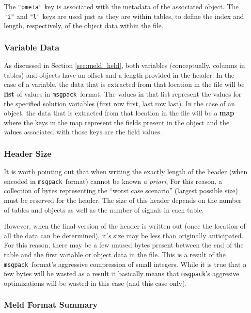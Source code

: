 \documentclass[11pt,a4paper,twocolumn]{article}
\newcommand{\msgpack}{\texttt{msgpack}}
\newcommand{\code}[1]{\texttt{#1}} %
\begin{document}
The \code{"ometa"} key is associated with the metadata of the
associated object.  The \code{"i"} and \code{"l"} keys are used just
as they are within tables, to define the index and length,
respectively, of the object data within the file.

\subsubsection{Variable Data}

As discussed in Section \ref{sec:meld_held}, both variables
(conceptually, columns in tables) and objects have an offset and a
length provided in the header.  In the case of a variable, the data
that is extracted from that location in the file will be \textbf{list}
of values in \msgpack\ format.  The values in that list represent the
values for the specified solution variables (first row first, last row
last).  In the case of an object, the data that is extracted from that
location in the file will be a \textbf{map} where the keys in the map
represent the fields present in the object and the values associated
with those keys are the field values.

\subsubsection{Header Size}


It is worth pointing out that when writing the exactly length of the
header (when encoded in \msgpack\ format) cannot be known \textit{a
  priori}, For this reason, a collection of bytes representing the
``worst case scenario'' (largest possible size) must be reserved for
the header.  The size of this header depends on the number of tables
and objects as well as the number of signals in each table.

However, when the final version of the header is written out (once the
location of all the data can be determined), it's size may be less
than originally anticipated.  For this reason, there may be a few
unused bytes present between the end of the table and the first
variable or object data in the file.  This is a result of the
\msgpack\ format's aggressive compression of small integers.  While it
is true that a few bytes will be wasted as a result it basically means
that \msgpack's aggresive optimizations will be wasted in this case
(and this case only).

\subsubsection{Meld Format Summary}
\end{document}
